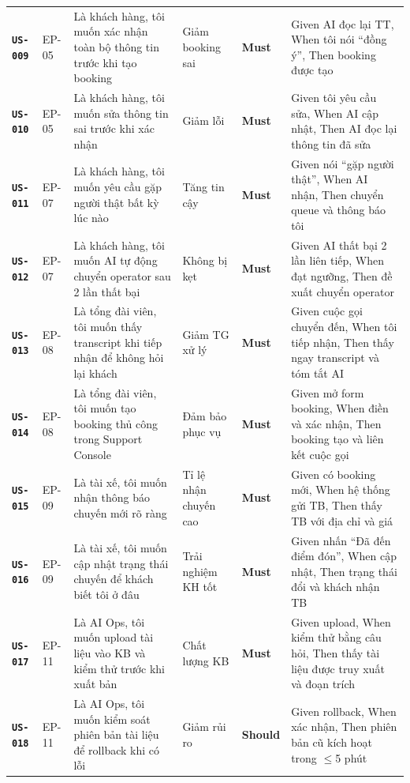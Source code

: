 \documentclass[12pt,a4paper]{article}
\newcommand{\storyid}[1]{\texttt{\textbf{\color{AloPurple}#1}}}
\newcommand{\musthave}{\colorbox{PrioMust}{\small\textbf{Must}}}
\newcommand{\shouldhave}{\colorbox{PrioShould}{\small\textbf{Should}}}
\begin{document}
\begin{longtable}{L{1.5cm} L{1.5cm} L{3.5cm} L{3.5cm} C{1.5cm} L{4cm}}
  \storyid{US-009} & EP-05 & Là khách hàng, tôi muốn xác nhận toàn bộ thông tin trước khi tạo booking & Giảm booking sai & \musthave & Given AI đọc lại TT, When tôi nói ``đồng ý'', Then booking được tạo \\
  \storyid{US-010} & EP-05 & Là khách hàng, tôi muốn sửa thông tin sai trước khi xác nhận & Giảm lỗi & \musthave & Given tôi yêu cầu sửa, When AI cập nhật, Then AI đọc lại thông tin đã sửa \\
  \storyid{US-011} & EP-07 & Là khách hàng, tôi muốn yêu cầu gặp người thật bất kỳ lúc nào & Tăng tin cậy & \musthave & Given nói ``gặp người thật'', When AI nhận, Then chuyển queue và thông báo tôi \\
  \storyid{US-012} & EP-07 & Là khách hàng, tôi muốn AI tự động chuyển operator sau 2 lần thất bại & Không bị kẹt & \musthave & Given AI thất bại 2 lần liên tiếp, When đạt ngưỡng, Then đề xuất chuyển operator \\
  \storyid{US-013} & EP-08 & Là tổng đài viên, tôi muốn thấy transcript khi tiếp nhận để không hỏi lại khách & Giảm TG xử lý & \musthave & Given cuộc gọi chuyển đến, When tôi tiếp nhận, Then thấy ngay transcript và tóm tắt AI \\
  \storyid{US-014} & EP-08 & Là tổng đài viên, tôi muốn tạo booking thủ công trong Support Console & Đảm bảo phục vụ & \musthave & Given mở form booking, When điền và xác nhận, Then booking tạo và liên kết cuộc gọi \\
  \storyid{US-015} & EP-09 & Là tài xế, tôi muốn nhận thông báo chuyến mới rõ ràng & Tỉ lệ nhận chuyến cao & \musthave & Given có booking mới, When hệ thống gửi TB, Then thấy TB với địa chỉ và giá \\
  \storyid{US-016} & EP-09 & Là tài xế, tôi muốn cập nhật trạng thái chuyến để khách biết tôi ở đâu & Trải nghiệm KH tốt & \musthave & Given nhấn ``Đã đến điểm đón'', When cập nhật, Then trạng thái đổi và khách nhận TB \\
  \storyid{US-017} & EP-11 & Là AI Ops, tôi muốn upload tài liệu vào KB và kiểm thử trước khi xuất bản & Chất lượng KB & \musthave & Given upload, When kiểm thử bằng câu hỏi, Then thấy tài liệu được truy xuất và đoạn trích \\
  \storyid{US-018} & EP-11 & Là AI Ops, tôi muốn kiểm soát phiên bản tài liệu để rollback khi có lỗi & Giảm rủi ro & \shouldhave & Given rollback, When xác nhận, Then phiên bản cũ kích hoạt trong $\leq$5 phút \\

\end{longtable}
\end{document}
